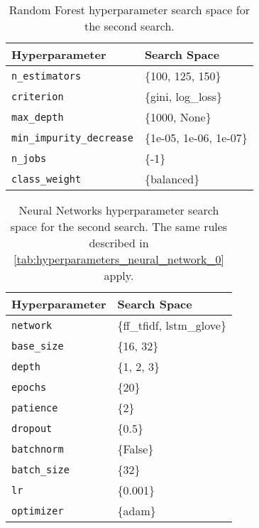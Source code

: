 \begin{table}[H]
\centering
\begin{tabularx}{0.48\textwidth}{|l|X|}
\hline
Hyperparameter & Search Space \\
\hline
\texttt{n\_estimators} & \{100, 125, 150\} \\
\texttt{criterion} & \{gini, log\_loss\} \\
\texttt{max\_depth} & \{1000, None\} \\
\texttt{min\_impurity\_decrease} & \{1e-05, 1e-06, 1e-07\} \\
\texttt{n\_jobs} & \{-1\} \\
\texttt{class\_weight} & \{balanced\} \\
\hline
\end{tabularx}
\caption{Random Forest hyperparameter search space for the second search.}
\label{tab:hyperparameters_random_forest_1}

\end{table}


\begin{table}[H]
\centering
\begin{tabularx}{0.48\textwidth}{|l|X|}
\hline
Hyperparameter & Search Space \\
\hline
\texttt{network} & \{ff\_tfidf, lstm\_glove\} \\
\texttt{base\_size} & \{16, 32\} \\
\texttt{depth} & \{1, 2, 3\} \\
\texttt{epochs} & \{20\} \\
\texttt{patience} & \{2\} \\
\texttt{dropout} & \{0.5\} \\
\texttt{batchnorm} & \{False\} \\
\texttt{batch\_size} & \{32\} \\
\texttt{lr} & \{0.001\} \\
\texttt{optimizer} & \{adam\} \\
\hline
\end{tabularx}
\caption{Neural Networks hyperparameter search space for the second search. The same rules described in \autoref{tab:hyperparameters_neural_network_0} apply.}
\label{tab:hyperparameters_neural_network_1}

\end{table}


